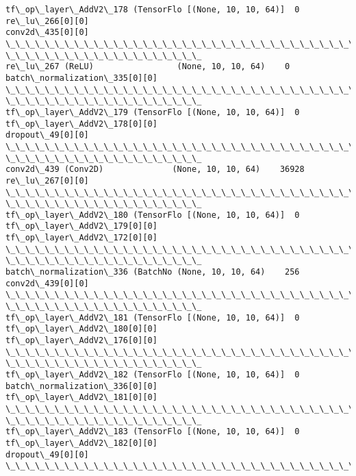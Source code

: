 \documentclass[11pt]{article}
\begin{document}
\begin{Verbatim}[commandchars=\\\{\}]
tf\_op\_layer\_AddV2\_178 (TensorFlo [(None, 10, 10, 64)]  0
re\_lu\_266[0][0]
conv2d\_435[0][0]
\_\_\_\_\_\_\_\_\_\_\_\_\_\_\_\_\_\_\_\_\_\_\_\_\_\_\_\_\_\_\_\_\_\_\_\_\_\_\_\_\_\_\_\_\_\_\_\_\_\_\_\_\_\_\_\_\_\_\_\_\_\_\_\_\_\_\_\_\_\_\_\_\_\_\_\_\_\_\_\_
\_\_\_\_\_\_\_\_\_\_\_\_\_\_\_\_\_\_\_\_
re\_lu\_267 (ReLU)                 (None, 10, 10, 64)    0
batch\_normalization\_335[0][0]
\_\_\_\_\_\_\_\_\_\_\_\_\_\_\_\_\_\_\_\_\_\_\_\_\_\_\_\_\_\_\_\_\_\_\_\_\_\_\_\_\_\_\_\_\_\_\_\_\_\_\_\_\_\_\_\_\_\_\_\_\_\_\_\_\_\_\_\_\_\_\_\_\_\_\_\_\_\_\_\_
\_\_\_\_\_\_\_\_\_\_\_\_\_\_\_\_\_\_\_\_
tf\_op\_layer\_AddV2\_179 (TensorFlo [(None, 10, 10, 64)]  0
tf\_op\_layer\_AddV2\_178[0][0]
dropout\_49[0][0]
\_\_\_\_\_\_\_\_\_\_\_\_\_\_\_\_\_\_\_\_\_\_\_\_\_\_\_\_\_\_\_\_\_\_\_\_\_\_\_\_\_\_\_\_\_\_\_\_\_\_\_\_\_\_\_\_\_\_\_\_\_\_\_\_\_\_\_\_\_\_\_\_\_\_\_\_\_\_\_\_
\_\_\_\_\_\_\_\_\_\_\_\_\_\_\_\_\_\_\_\_
conv2d\_439 (Conv2D)              (None, 10, 10, 64)    36928
re\_lu\_267[0][0]
\_\_\_\_\_\_\_\_\_\_\_\_\_\_\_\_\_\_\_\_\_\_\_\_\_\_\_\_\_\_\_\_\_\_\_\_\_\_\_\_\_\_\_\_\_\_\_\_\_\_\_\_\_\_\_\_\_\_\_\_\_\_\_\_\_\_\_\_\_\_\_\_\_\_\_\_\_\_\_\_
\_\_\_\_\_\_\_\_\_\_\_\_\_\_\_\_\_\_\_\_
tf\_op\_layer\_AddV2\_180 (TensorFlo [(None, 10, 10, 64)]  0
tf\_op\_layer\_AddV2\_179[0][0]
tf\_op\_layer\_AddV2\_172[0][0]
\_\_\_\_\_\_\_\_\_\_\_\_\_\_\_\_\_\_\_\_\_\_\_\_\_\_\_\_\_\_\_\_\_\_\_\_\_\_\_\_\_\_\_\_\_\_\_\_\_\_\_\_\_\_\_\_\_\_\_\_\_\_\_\_\_\_\_\_\_\_\_\_\_\_\_\_\_\_\_\_
\_\_\_\_\_\_\_\_\_\_\_\_\_\_\_\_\_\_\_\_
batch\_normalization\_336 (BatchNo (None, 10, 10, 64)    256
conv2d\_439[0][0]
\_\_\_\_\_\_\_\_\_\_\_\_\_\_\_\_\_\_\_\_\_\_\_\_\_\_\_\_\_\_\_\_\_\_\_\_\_\_\_\_\_\_\_\_\_\_\_\_\_\_\_\_\_\_\_\_\_\_\_\_\_\_\_\_\_\_\_\_\_\_\_\_\_\_\_\_\_\_\_\_
\_\_\_\_\_\_\_\_\_\_\_\_\_\_\_\_\_\_\_\_
tf\_op\_layer\_AddV2\_181 (TensorFlo [(None, 10, 10, 64)]  0
tf\_op\_layer\_AddV2\_180[0][0]
tf\_op\_layer\_AddV2\_176[0][0]
\_\_\_\_\_\_\_\_\_\_\_\_\_\_\_\_\_\_\_\_\_\_\_\_\_\_\_\_\_\_\_\_\_\_\_\_\_\_\_\_\_\_\_\_\_\_\_\_\_\_\_\_\_\_\_\_\_\_\_\_\_\_\_\_\_\_\_\_\_\_\_\_\_\_\_\_\_\_\_\_
\_\_\_\_\_\_\_\_\_\_\_\_\_\_\_\_\_\_\_\_
tf\_op\_layer\_AddV2\_182 (TensorFlo [(None, 10, 10, 64)]  0
batch\_normalization\_336[0][0]
tf\_op\_layer\_AddV2\_181[0][0]
\_\_\_\_\_\_\_\_\_\_\_\_\_\_\_\_\_\_\_\_\_\_\_\_\_\_\_\_\_\_\_\_\_\_\_\_\_\_\_\_\_\_\_\_\_\_\_\_\_\_\_\_\_\_\_\_\_\_\_\_\_\_\_\_\_\_\_\_\_\_\_\_\_\_\_\_\_\_\_\_
\_\_\_\_\_\_\_\_\_\_\_\_\_\_\_\_\_\_\_\_
tf\_op\_layer\_AddV2\_183 (TensorFlo [(None, 10, 10, 64)]  0
tf\_op\_layer\_AddV2\_182[0][0]
dropout\_49[0][0]
\_\_\_\_\_\_\_\_\_\_\_\_\_\_\_\_\_\_\_\_\_\_\_\_\_\_\_\_\_\_\_\_\_\_\_\_\_\_\_\_\_\_\_\_\_\_\_\_\_\_\_\_\_\_\_\_\_\_\_\_\_\_\_\_\_\_\_\_\_\_\_\_\_\_\_\_\_\_\_\_

\end{Verbatim}
\end{document}
